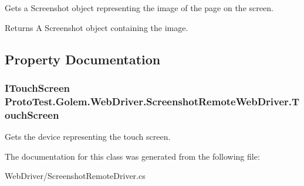 Gets a Screenshot object representing the image of the page on the screen. 

\begin{DoxyReturn}{Returns}
A Screenshot object containing the image.
\end{DoxyReturn}


\subsection{Property Documentation}
\hypertarget{class_proto_test_1_1_golem_1_1_web_driver_1_1_screenshot_remote_web_driver_a7ad0bf5a911d7ee6280ef647eaab3aff}{
\subsubsection[{Touch\-Screen}]{\setlength{\rightskip}{0pt plus 5cm}I\-Touch\-Screen Proto\-Test.\-Golem.\-Web\-Driver.\-Screenshot\-Remote\-Web\-Driver.\-Touch\-Screen\hspace{0.3cm}{\ttfamily [get]}}}\label{class_proto_test_1_1_golem_1_1_web_driver_1_1_screenshot_remote_web_driver_a7ad0bf5a911d7ee6280ef647eaab3aff}


Gets the device representing the touch screen. 



The documentation for this class was generated from the following file\-:\begin{DoxyCompactItemize}
\item 
Web\-Driver/Screenshot\-Remote\-Driver.\-cs\end{DoxyCompactItemize}
